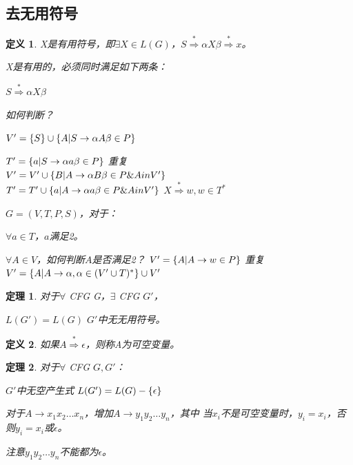 \documentclass{ctexart}
\newtheorem{definition}{定义}[section]
\newtheorem{theorem}{定理}[section]
\DeclarePairedDelimiter{\set}{\{}{\}}
\begin{document}
\subsection{去无用符号}
\begin{definition}
    X是有用符号，即$\exists X \in L(G)$，$S \overset{*} \Rightarrow
    \alpha X \beta \overset{*} \Rightarrow x$。

    X是有用的，必须同时满足如下两条：
    \begin{outline}[enumerate]
        \1 $S \overset{*} \Rightarrow \alpha X \beta$
            
            如何判断？

            \2 $V' = \set{S} \cup \set{A | S \to \alpha A \beta \in P}$

                $T' = \set{a | S \to \alpha a \beta \in P}$
            \2 重复 \\
            $V' = V' \cup \set{B | A \to \alpha B \beta \in P \& A in V'}$ \\
            $T' = T' \cup \set{a | A \to \alpha a \beta \in P \& A in V'}$
        \1 $X \overset{*} \Rightarrow w, w \in T^*$
        
            $G = (V, T, P, S)$，对于：

            $\forall a \in T$，$a$满足2。
        
            $\forall A \in V$，如何判断$A$是否满足2？
                \2 $V' = \set{A | A \to w \in P}$
                \2 重复 $V' = \set{A | A \to \alpha, \alpha \in (V' \cup T)^*} \cup V'$
    \end{outline}
\end{definition}
\begin{theorem}
    对于$\forall$ CFG G，$\exists$ CFG $G'$，
    \begin{outline}[enumerate]
        \1 $L(G') = L(G)$
        \1 $G'$中无无用符号。
    \end{outline}
\end{theorem}
\begin{definition}
    如果$A \overset{*} \Rightarrow \epsilon$，则称A为可空变量。
\end{definition}
\begin{theorem}
    对于$\forall$ CFG $G, G'$：
    \begin{outline}[enumerate]
        \1 $G'$中无空产生式
        \1 $L(G') = L(G) - \set{\epsilon}$
    \end{outline}
    对于$A \to x_1x_2\dots x_n$，增加$A \to y_1y_2\dots y_n$，其中
    当$x_i$不是可空变量时，$y_i = x_i$，否则$y_i = x_i$或$\epsilon$。

    注意$y_1y_2\dots y_n$不能都为$\epsilon$。
\end{theorem}
\end{document}
